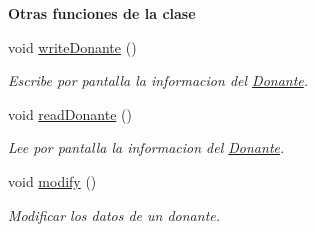 \begin{Indent}{\bf Otras funciones de la clase}\par
\begin{DoxyCompactItemize}
\item 
void \hyperlink{classed_1_1Donante_a9d38e1caacf3dee07477fb49da65d65e}{write\+Donante} ()\hypertarget{classed_1_1Donante_a9d38e1caacf3dee07477fb49da65d65e}{}\label{classed_1_1Donante_a9d38e1caacf3dee07477fb49da65d65e}

\begin{DoxyCompactList}\small\item\em Escribe por pantalla la informacion del \hyperlink{classed_1_1Donante}{Donante}. \end{DoxyCompactList}\item 
void \hyperlink{classed_1_1Donante_a82deb00969394d9b5c85c36c3256d4d4}{read\+Donante} ()\hypertarget{classed_1_1Donante_a82deb00969394d9b5c85c36c3256d4d4}{}\label{classed_1_1Donante_a82deb00969394d9b5c85c36c3256d4d4}

\begin{DoxyCompactList}\small\item\em Lee por pantalla la informacion del \hyperlink{classed_1_1Donante}{Donante}. \end{DoxyCompactList}\item 
void \hyperlink{classed_1_1Donante_a86a221eec5fc5800f51a96d732c80124}{modify} ()\hypertarget{classed_1_1Donante_a86a221eec5fc5800f51a96d732c80124}{}\label{classed_1_1Donante_a86a221eec5fc5800f51a96d732c80124}

\begin{DoxyCompactList}\small\item\em Modificar los datos de un donante. \end{DoxyCompactList}\end{DoxyCompactItemize}
\end{Indent}
